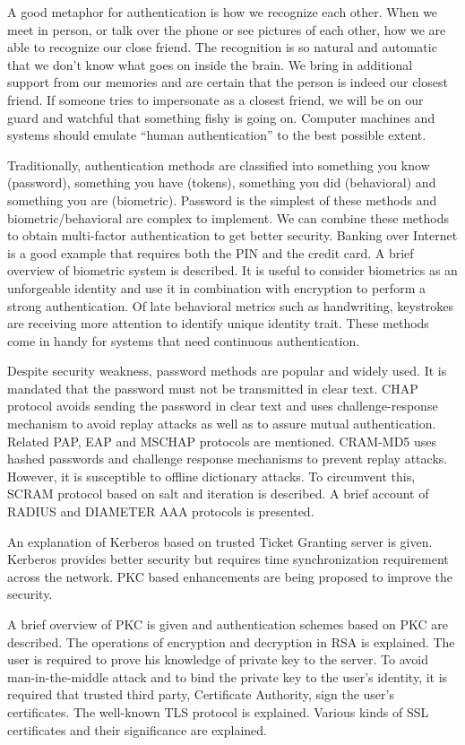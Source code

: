 \begin{multicols}{2}
A good metaphor for authentication is how we recognize each other. When we meet in person, or talk over the phone or see pictures of each other, how we are able to recognize our close friend. The recognition is so natural and automatic that we don't know what goes on inside the brain. We bring in additional support from our memories and are certain that the person is indeed our closest friend. If someone tries to impersonate as a closest friend, we will be on our guard and watchful that something fishy is going on. Computer machines and systems should emulate ``human authentication'' to the best possible extent.

Traditionally, authentication methods are classified into something you know (password), something you have (tokens), something you did (behavioral) and something you are (biometric). Password is the simplest of these methods and biometric/behavioral are complex to implement. We can combine these methods to obtain multi-factor authentication to get better security. Banking over Internet is a good example that requires both the PIN and the credit card. A brief overview of biometric system is described. It is useful to consider biometrics as an unforgeable identity and use it in combination with encryption to perform a strong authentication. Of late behavioral metrics such as handwriting, keystrokes are receiving more attention to identify unique identity trait. These methods come in handy for systems that need continuous authentication.

Despite security weakness, password methods are popular and widely used. It is mandated that the password must not be transmitted in clear text. CHAP protocol avoids sending the password in clear text and uses challenge-response mechanism to avoid replay attacks as well as to assure mutual authentication. Related PAP, EAP and MSCHAP protocols are mentioned. CRAM-MD5 uses hashed passwords and challenge response mechanisms to prevent replay attacks. However, it is susceptible to offline dictionary attacks. To circumvent this, SCRAM protocol based on salt and iteration is described. A brief account of RADIUS and DIAMETER AAA protocols is presented.

An explanation of Kerberos based on trusted Ticket Granting server is given. Kerberos provides better security but requires time synchronization requirement across the network. PKC based enhancements are being proposed to improve the security.

A brief overview of PKC is given and authentication schemes based on PKC are described. The operations of encryption and decryption in RSA is explained. The user is required to prove his knowledge of private key to the server. To avoid man-in-the-middle attack and to bind the private key to the user's identity, it is required that trusted third party, Certificate Authority, sign the user's certificates. The well-known TLS protocol is explained. Various kinds of SSL certificates and their significance are explained.


\end{multicols}
